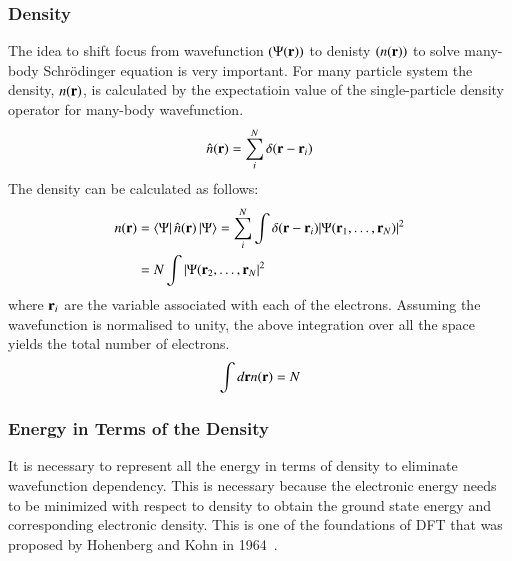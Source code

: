 \subsubsection{Density}
The idea to shift focus from wavefunction $(\Psi(\vb{r}))$ to denisty $(n(\vb{r}))$ to solve many-body Schr\"odinger equation is very important. For many particle system the density, $n(\vb{r})$, is calculated by the expectatioin value of the single-particle density operator for many-body wavefunction.
\begin{equation}
\hat{n}(\vb{r}) = \sum_i^N \delta(\vb{r} - \vb{r}_i)
\end{equation}
The density can be calculated as follows:
\begin{align}\label{deneqn}
\begin{split}
n(\vb{r}) & = \bra{\Psi}\hat{n}(\vb{r})\ket{\Psi} = \sum_i^N \int \delta(\vb{r}- \vb{r}_i) \abs{\Psi(\vb{r}_1,\dots,\vb{r}_N)}^2\\
    & = N \int \abs{\Psi(\vb{r}_2,\dots,\vb{r}_N}^2
\end{split}
\end{align}
where $\vb{r}_i$ are the variable associated with each of the electrons. Assuming the wavefunction is normalised to unity, the above integration over all the space yields the total number of electrons.
\begin{equation}
	\int d\vb{r} n(\vb{r}) = N
\end{equation} 


\subsubsection{Energy in Terms of the Density}
It is necessary to represent all the energy in terms of density to eliminate wavefunction dependency. This is necessary because the electronic energy needs to be minimized with respect to density to obtain the ground state energy and corresponding electronic density. This is one of the foundations of DFT that was proposed by Hohenberg and Kohn in 1964~\cite{hohenberg1964inhomogeneous}.

